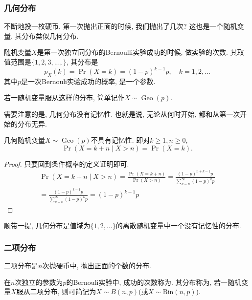 \documentclass{ctexart}
\begin{document}
\subsubsection{几何分布} 不断地投一枚硬币, 第一次抛出正面的时候, 我们抛出了几次? 这也是一个随机变量. 其分布类似几何分布. 

\begin{definition}[几何分布随机变量]
    随机变量$X$是第一次独立同分布的Bernoulli实验成功的时候, 做实验的次数. 其取值范围是$\{ 1,2,3, ...,  \}$, 其分布是
    $$
p_X(k)=\operatorname{Pr}(X=k)=(1-p)^{k-1} p, \quad k=1,2, \ldots
$$
其中$p$是一次Bernouli实验成功的概率, 是一个参数. 
\end{definition}

若一随机变量服从这样的分布, 简单记作$X \sim \operatorname{Geo}(p)$.

需要注意的是, 几何分布没有记忆性. 也就是说, 无论从何时开始, 都和从第一次开始的分布无异.  

\begin{prop}
   几何随机变量$X \sim \operatorname{Geo}(p)$不具有记忆性. 即对$k \geq 1, n \geq 0$, 
   $$\operatorname{Pr}(X=k+n \mid X>n)=\operatorname{Pr}(X=k).$$


\end{prop}

\begin{proof}
    只要回到条件概率的定义证明即可.
    $$
\begin{gathered}
\operatorname{Pr}(X=k+n \mid X>n)=\frac{\operatorname{Pr}(X=k+n)}{\operatorname{Pr}(X>n)}=\frac{(1-p)^{n+k-1} p}{\sum_{k=n}^{\infty}(1-p)^k p} \\
=\frac{(1-p)^{k-1} p}{\sum_{k=0}^{\infty}(1-p)^k p}=(1-p)^{k-1} p
\end{gathered}
$$
\end{proof}


顺带一提, 几何分布是值域为$\{ 1,2, ... \}$的离散随机变量中一个没有记忆性的分布. 

\subsubsection{二项分布} 二项分布是$n$次抛硬币中, 抛出正面的个数的分布. 

\begin{definition}[二项随机变量]
    在$n$次独立的参数为$p$的Bernouli实验中, 成功的次数称为. 其分布称为, 若一随机变量$X$服从二项分布, 则可简记为$X\sim B ( n, p)$(或$X\sim \text{Bin}(n,p)$).
\end{definition}
\end{document}
